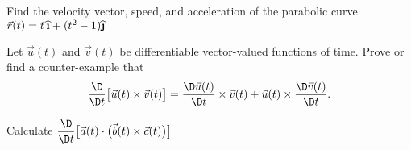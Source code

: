 \begin{exercise}
Find the velocity vector, speed, and acceleration of the
parabolic curve $\vec{r}(t) =
t\,\widehat{\textbf{\i}}+(t^{2}-1)\widehat{\textbf{\j}}$
\end{exercise}

\begin{exercise}
Let $\vec{u}(t)$ and $\vec{v}(t)$ be differentiable vector-valued
functions of time. Prove or find a counter-example that
\begin{equation}
\frac{\D}{\D t}\bigl[\vec{u}(t)\times\vec{v}(t)\bigr]=
\frac{\D\vec{u}(t)}{\D t}\times\vec{v}(t) +
\vec{u}(t)\times\frac{\D\vec{v}(t)}{\D t}.
\end{equation}
\end{exercise}
\begin{exercise}
Calculate $\displaystyle\frac{\D}{\D t}\bigl[\vec{a}(t)\cdot\bigl(\vec{b}(t)\times\vec{c}(t)\bigr)\bigr]$
\end{exercise}
